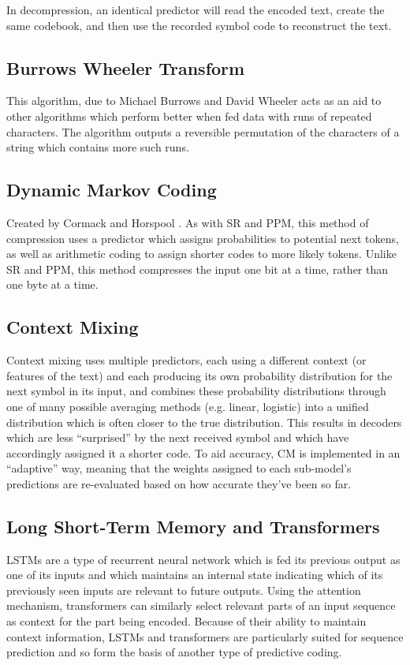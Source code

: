 In decompression, an identical predictor will read the encoded text, create the same codebook, and then use the recorded symbol code to reconstruct the text. \autocite{Fenwick1998}

\subsection*{Burrows Wheeler Transform}
This algorithm, due to Michael Burrows and David Wheeler \autocite{Burrows1994} acts as an aid to other algorithms which perform better when fed data with runs of repeated characters. The algorithm outputs a reversible permutation of the characters of a string which contains more such runs.

\subsection*{Dynamic Markov Coding}
Created by Cormack and Horspool \autocite{Cormack1987}. As with SR and PPM, this method of compression uses a predictor which assigns probabilities to potential next tokens, as well as arithmetic coding to assign shorter codes to more likely tokens. Unlike SR and PPM, this method compresses the input one bit at a time, rather than one byte at a time.

\subsection*{Context Mixing}
Context mixing uses multiple predictors, each using a different context (or features of the text) and each producing its own probability distribution for the next symbol in its input, and combines these probability distributions through one of many possible averaging methods (e.g. linear, logistic) into a unified distribution which is often closer to the true distribution. This results in decoders which are less “surprised” by the next received symbol and which have accordingly assigned it a shorter code. To aid accuracy, CM is implemented in an “adaptive” way, meaning that the weights assigned to each sub-model’s predictions are re-evaluated based on how accurate they’ve been so far. \autocite{Mahoney2005}

\subsection*{Long Short-Term Memory and Transformers}
LSTMs are a type of recurrent neural network which is fed its previous output as one of its inputs and which maintains an internal state indicating which of its previously seen inputs are relevant to future outputs. Using the attention mechanism, transformers can similarly select relevant parts of an input sequence as context for the part being encoded. Because of their ability to maintain context information, LSTMs and transformers are particularly suited for sequence prediction and so form the basis of another type of predictive coding.